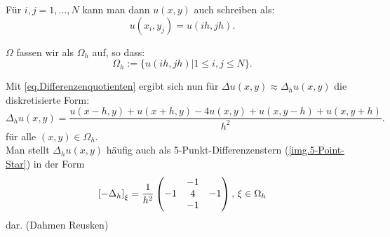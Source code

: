 Für $i,j = 1,...,N$ kann man dann $u(x,y)$ auch schreiben als:
\begin{equation}
u(x_{i},y_{j}) = u(ih,jh).
\end{equation}

$\Omega$ fassen wir als $\Omega_{h}$ auf, so dass:
\begin{equation}
\Omega_{h} := \{u(ih, jh) | 1 \le i,j \le N\}.
\end{equation}


Mit \autoref{eq.Differenzenquotienten} ergibt sich nun für $\Delta u(x,y) \approx \Delta_{h} u(x,y)$ die diskretisierte Form:
\begin{equation}
\Delta_{h} u(x,y) = \frac {u(x-h,y) + u(x+h,y) - 4u(x,y) + u(x,y-h) + u(x,y+h)} {h^{2}}.\label{eq.5-Point-Star}
\end{equation}
für alle $(x,y) \in \Omega_{h}$. \\
Man stellt $\Delta_{h} u(x,y)$ häufig auch als 5-Punkt-Differenzenstern (\autoref{img.5-Point-Star}) in der Form
\begin{equation}
\left[-\Delta_{h}\right]_{\xi} = \frac {1} {h^{2}}
\begin{pmatrix}
  & -1 & \\
-1 & 4 & -1 \\
  & -1 & 
\end{pmatrix}
\textnormal{, } \xi \in \Omega_{h}
\end{equation}
dar. (Dahmen Reusken)

